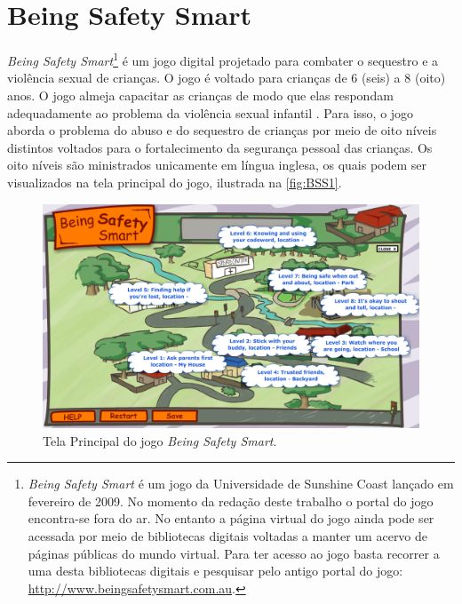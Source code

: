 
\section{Being Safety Smart}\label{sssec:Being}

\textit{Being Safety Smart}\footnote{\textit{Being Safety Smart} é um jogo  da Universidade de Sunshine Coast lançado em fevereiro de 2009. No momento da redação deste trabalho o portal do jogo encontra-se fora do ar. No entanto a página virtual do jogo ainda pode ser acessada por meio de bibliotecas digitais voltadas a manter um acervo de páginas públicas do mundo virtual. Para ter acesso ao jogo basta recorrer a uma desta bibliotecas digitais e pesquisar pelo antigo portal do jogo: \url{http://www.beingsafetysmart.com.au}.} é um jogo digital projetado para combater o sequestro e a violência sexual de crianças. O jogo é voltado para crianças de 6 (seis) a 8 (oito) anos. O jogo almeja capacitar as crianças de modo que elas respondam adequadamente ao problema da violência sexual infantil \cite{jones2008online}. Para isso, o jogo aborda  o problema do abuso e do sequestro de crianças por meio de oito níveis distintos voltados para o fortalecimento da segurança pessoal das crianças. Os oito níveis são ministrados unicamente em língua inglesa, os quais podem ser visualizados na tela principal do jogo, ilustrada na \autoref{fig:BSS1}. 

\begin{figure}[htb]
	\caption{\label{fig:BSS1}Tela Principal do jogo \textit{Being Safety Smart}.}
  \begin{center}\vspace{-0.3cm}
    \includegraphics[width=\linewidth]{./Visuais/BSS/B1.png}
	\end{center}\vspace{-0.2cm}
\end{figure}


